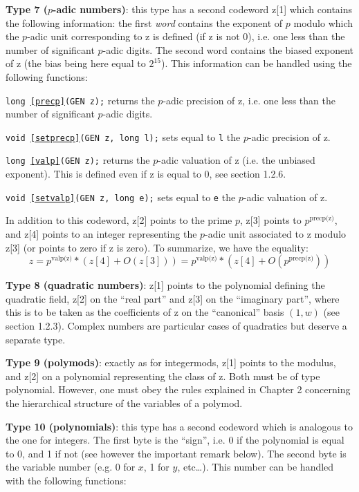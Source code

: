{\bf Type 7 ($p$-adic numbers)}: 
this type has a second codeword z[1] which
contains the following information: the first {\it word\/} contains the exponent
of $p$ modulo which the $p$-adic unit corresponding to z is defined (if z is not 0),
i.e. one less than the number of significant $p$-adic digits. The second word
contains the biased exponent of z (the bias being here equal to $2^{15}$).
This information can be handled using the following functions:

{\tt long \ref{precp}(GEN z);} returns the $p$-adic precision of z, i.e. one less
than the number of significant $p$-adic digits.

{\tt void \ref{setprecp}(GEN z, long l);} sets equal to {\tt l} the $p$-adic precision of z.

{\tt long \ref{valp}(GEN z);} returns the $p$-adic valuation of z (i.e. the
unbiased exponent). This is defined even if z is equal to 0, see section 1.2.6.

{\tt void \ref{setvalp}(GEN z, long e);} sets equal to {\tt e} the $p$-adic valuation of z.

In addition to this codeword, z[2] points to the prime $p$, z[3] points to
$p^{\text{precp(z)}}$, and z[4] points to an integer representing the $p$-adic
unit associated to z modulo z[3] (or points to zero if z is zero).
To summarize, we have the equality:
$$z=p^{\text{valp(z)}}*(z[4]+O(z[3]))=p^{\text{valp(z)}}*(z[4]+O(p^{\text{precp(z)}}))$$

{\bf Type 8 (quadratic numbers)}: 
z[1] points to the polynomial defining the
quadratic field, z[2] on the ``real part'' and z[3] on the ``imaginary part'',
where this is to be taken as the coefficients of z on the ``canonical'' basis $(1,w)$
(see section 1.2.3). Complex numbers are particular cases of quadratics but deserve
a separate type.

{\bf Type 9 (polymods)}: 
exactly as for integermods, z[1] points to the modulus,
and z[2] on a polynomial representing the class of z. Both must be of type 
polynomial. However, one must obey the rules explained in Chapter 2 concerning
the hierarchical structure of the variables of a polymod.

{\bf Type 10 (polynomials)}: 
this type has a second codeword which is analogous to
the one for integers. The first byte is the ``sign'', i.e. 0 if the polynomial
is equal to 0, and 1 if not (see however the important remark below).
The second byte is the variable number (e.g. 0 for $x$, 1 for $y$, 
etc\dots). This number can be handled with the following functions:

